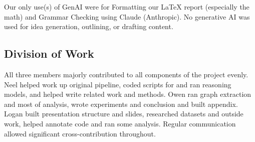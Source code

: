 \documentclass[letterpaper]{article}
\begin{document}
Our only use(s) of GenAI were for Formatting our LaTeX report (especially the math) and Grammar Checking using Claude (Anthropic). No generative AI was used for idea generation, outlining, or drafting content.

\subsection{Division of Work}
All three members majorly contributed to all components of the project evenly. Neel helped work up original pipeline, coded scripts for and ran reasoning models, and helped write related work and methods. Owen ran graph extraction and most of analysis, wrote experiments and conclusion and built appendix. Logan built presentation structure and slides, researched datasets and outside work, helped annotate code and ran some analysis. Regular communication allowed significant cross-contribution throughout.

\end{document}
